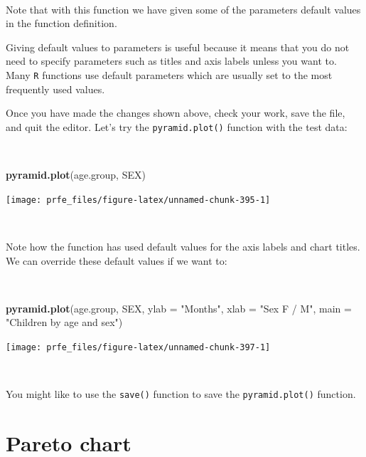 \documentclass[12pt,a4paper]{book}
\newenvironment{Shaded}{\begin{snugshade}}{\end{snugshade}}
\newcommand{\KeywordTok}[1]{\textcolor[rgb]{0.13,0.29,0.53}{\textbf{#1}}}
\newcommand{\DataTypeTok}[1]{\textcolor[rgb]{0.13,0.29,0.53}{#1}}
\newcommand{\StringTok}[1]{\textcolor[rgb]{0.31,0.60,0.02}{#1}}
\newcommand{\NormalTok}[1]{#1}
\theoremstyle{definition}
\theoremstyle{definition}
\theoremstyle{definition}
\theoremstyle{remark}
\begin{document}
~

Note that with this function we have given some of the parameters
default values in the function definition.

Giving default values to parameters is useful because it means that you
do not need to specify parameters such as titles and axis labels unless
you want to. Many \texttt{R} functions use default parameters which are
usually set to the most frequently used values.

Once you have made the changes shown above, check your work, save the
file, and quit the editor. Let's try the \texttt{pyramid.plot()}
function with the test data:

~

\begin{Shaded}
\begin{Highlighting}[]
\KeywordTok{pyramid.plot}\NormalTok{(age.group, SEX)}
\end{Highlighting}
\end{Shaded}

\begin{center}\texttt{[image: prfe\_files/figure-latex/unnamed-chunk-395-1]} \end{center}

~

Note how the function has used default values for the axis labels and
chart titles. We can override these default values if we want to:

~

\begin{Shaded}
\begin{Highlighting}[]
\KeywordTok{pyramid.plot}\NormalTok{(age.group, SEX, }\DataTypeTok{ylab =} \StringTok{"Months"}\NormalTok{, }\DataTypeTok{xlab =} \StringTok{"Sex F / M"}\NormalTok{,}
             \DataTypeTok{main =} \StringTok{"Children by age and sex"}\NormalTok{)}
\end{Highlighting}
\end{Shaded}

\newpage

\begin{center}\texttt{[image: prfe\_files/figure-latex/unnamed-chunk-397-1]} \end{center}

~

You might like to use the \texttt{save()} function to save the
\texttt{pyramid.plot()} function.

\hypertarget{pareto-chart}{%
\section{Pareto chart}\label{pareto-chart}}
\end{document}
